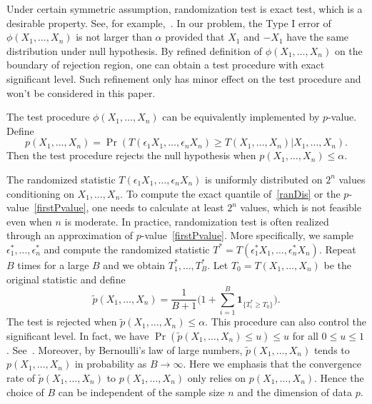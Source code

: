 \documentclass[review]{elsarticle}
\theoremstyle{plain}
\theoremstyle{definition}
\theoremstyle{remark}
\begin{document}
Under certain symmetric assumption, randomization test is exact test, which is a desirable property.
 See, for example,~\citet[Chapter 15]{Lehmann}.
In our problem, the Type I error of $\phi(X_1,\ldots,X_n)$ is not larger than $\alpha$ provided that $X_1$ and $-X_1$ have the same distribution under null hypothesis.
 By refined definition of $\phi(X_1,\ldots,X_n)$ on the boundary of rejection region, one can obtain a test procedure with exact significant  level. 
Such refinement only has minor effect on the test procedure and won't be considered in this paper.

The test procedure $\phi(X_1,\ldots, X_n)$ can be equivalently implemented by $p$-value. Define 
\begin{equation}\label{firstPvalue}
        p(X_1,\ldots, X_n)
        =\Pr(T(\epsilon_1 X_1,\ldots,\epsilon_n X_n)\geq T( X_1,\ldots,X_n)|X_1,\ldots,X_n).
\end{equation}
Then the test procedure rejects the null hypothesis when $p(X_1,\ldots, X_n)\leq \alpha$. 

 The randomized statistic $T(\epsilon_1 X_1,\ldots,\epsilon_n X_n)$ is uniformly distributed on $2^n$ values conditioning on $X_1,\ldots, X_n$.
To compute the exact quantile of~\eqref{ranDis} or the $p$-value~\eqref{firstPvalue}, one needs to calculate at least $2^n$ values, which is not feasible even when $n$ is moderate.
In practice, randomization test is often realized through an approximation of $p$-value~\eqref{firstPvalue}.
More specifically, we sample  $\epsilon_1^*,\ldots,\epsilon_n^*$ and compute the randomized statistic $T^*=T(\epsilon_1^* X_1,\ldots,\epsilon_n^* X_n)$.
Repeat $B$ times for a large $B$ and we obtain $T_1^*,\ldots,T_B^*$.
Let $T_0=T(X_1,\ldots,X_n)$ be the original statistic and define
\begin{equation*}
\tilde{p}(X_1,\ldots,X_n)=\frac{1}{B+1}\big(1+\sum_{i=1}^B \mathbf{1}_{\{T_i^*\geq T_0\}}\big).
\end{equation*}
The test is rejected when $\tilde{p}(X_1,\ldots,X_n)\leq \alpha$. This procedure can also control the significant level.
In fact, we have
$\Pr(\tilde{p}(X_1,\ldots,X_n)\leq u)\leq u$ for all $0\leq u\leq 1$.
See~\citet[Page $636$]{Lehmann}.
Moreover, by Bernoulli's law of large numbers, $\tilde{p}(X_1,\ldots,X_n)$ tends to $p(X_1,\ldots,X_n)$ in probability  as $B\to \infty$.
{Here we emphasis that the convergence rate of $\tilde{p}(X_1,\ldots,X_n)$ to $p(X_1,\ldots,X_n)$ only relies on $p(X_1,\ldots,X_n)$.
Hence the choice of $B$ can be independent of the sample size $n$ and the dimension of data $p$.}
\end{document}
